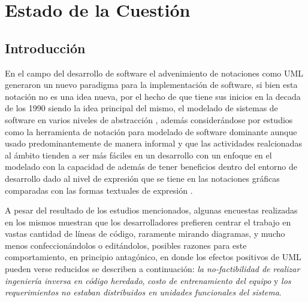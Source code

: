 \chapter{Estado de la Cuestión}%
\label{sec:estadodelacuestion}

\section{Introducción}
\label{sec:problematica}
En el campo del desarrollo de software el advenimiento de notaciones como UML
generaron un nuevo paradigma para la implementación de software, si bien esta
notación no es una idea nueva, por el hecho de que tiene sus inicios en la decada de los
1990 siendo la idea principal del mismo, el modelado de sistemas de software en
varios niveles de abstracción  \cite{chaudron2017}, además considerándose por
estudios como la herramienta de notación para modelado de software dominante
\cite{aldaeej2016} aunque usado predominantemente de manera informal y que las
actividades realcionadas al ámbito tienden a ser
más fáciles en un desarrollo con un enfoque en el modelado \cite{forward2010}
con la capacidad de además de tener beneficios dentro del entorno de desarrollo
dado al nivel de expresión que se tiene en las
notaciones gráficas comparadas con las formas textuales de expresión
\cite{rumpe2004}.

A pesar del resultado de los estudios mencionados, algunas encuestas realizadas
en los mismos muestran que los desarrolladores prefieren centrar el trabajo en vastas
cantidad de líneas de código, raramente mirando diagramas, y mucho menos
confeccionándolos o editándolos, posibles razones para este
comportamiento, en principio antagónico, en donde los efectos positivos de UML pueden
verse reducidos \cite{bente2006} se describen a continuación:
\textit{la no-factibilidad de realizar ingeniería inversa en código heredado},
\textit{costo de entrenamiento del equipo} y \textit{los requerimientos no
estaban distribuidos en unidades funcionales del sistema}.

